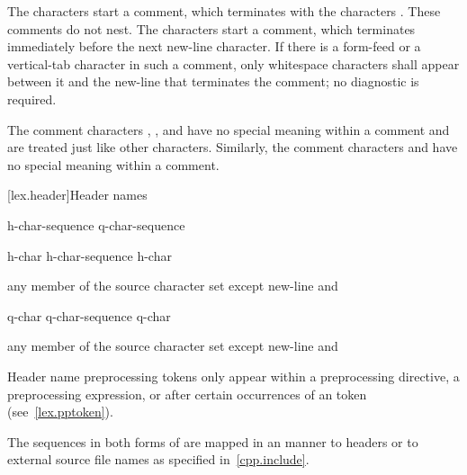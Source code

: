 \pnum
{}%
%
%
The characters \tcode{/*} start a comment, which terminates with the
characters \tcode{*/}. These comments do not nest.
%
The characters \tcode{//} start a comment, which terminates immediately before the
next new-line character. If there is a form-feed or a vertical-tab
character in such a comment, only whitespace characters shall appear
between it and the new-line that terminates the comment; no diagnostic
is required.
\begin{note}
The comment characters \tcode{//}, \tcode{/*},
and \tcode{*/} have no special meaning within a \tcode{//} comment and
are treated just like other characters. Similarly, the comment
characters \tcode{//} and \tcode{/*} have no special meaning within a
\tcode{/*} comment.
\end{note}

[lex.header]{Header names}

%
\begin{bnf}
\br
    \terminal{<} h-char-sequence \terminal{>}\br
     q-char-sequence 
\end{bnf}

\begin{bnf}
\br
    h-char\br
    h-char-sequence h-char
\end{bnf}

\begin{bnf}
\br
    \textnormal{any member of the source character set except new-line and \terminal{>}}
\end{bnf}

\begin{bnf}
\br
    q-char\br
    q-char-sequence q-char
\end{bnf}

\begin{bnf}
\br
    \textnormal{any member of the source character set except new-line and }
\end{bnf}

\pnum
\begin{note}
Header name preprocessing tokens only appear within
a  preprocessing directive,
a  preprocessing expression, or
after certain occurrences of an  token
(see~\ref{lex.pptoken}).
\end{note}
The sequences in both forms of  are mapped in an
 manner to headers or to
external source file names as specified in~\ref{cpp.include}.

